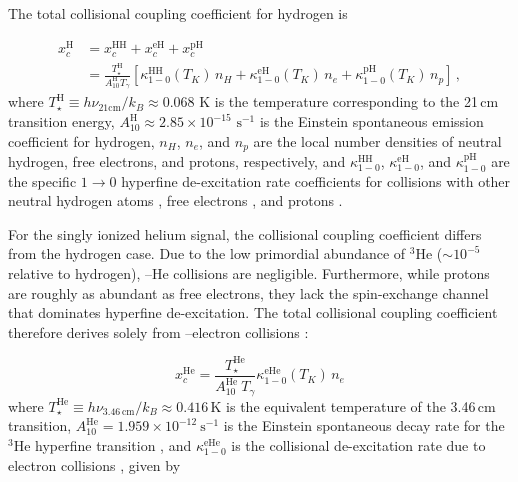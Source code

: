 \documentclass[apj,twocolumn, appendixfloats, twocolappendix, numberedappendix, tighten]{openjournal}
\begin{document}
\begin{appendix}
The total collisional coupling coefficient for hydrogen is

\begin{equation}
    \begin{split}
        x^\mathrm{H}_{c} & = x^\mathrm{HH}_c + x^\mathrm{eH}_c + x^\mathrm{pH}_c \\
        & = \frac{T^\mathrm{H}_{\star}}{A^{\mathrm{H}}_{10}T_\gamma} \left[ \kappa^\mathrm{HH}_{1-0} (T_K) \,n_H + \kappa^\mathrm{eH}_{1-0} (T_K) \,n_e + \kappa^\mathrm{pH}_{1-0} (T_K) \,n_p \right]\,,
    \end{split}
\end{equation}
where $T^\mathrm{H}_{\star} \equiv h\nu_{21\mathrm{cm}}/k_B \approx 0.068$ K is the temperature corresponding to the 21\,cm transition energy, $A^\mathrm{H}_{10} \approx 2.85 \times 10^{-15} \text{ s}^{-1}$ is the Einstein spontaneous emission coefficient for hydrogen, $n_H$, $n_e$, and $n_p$ are the local number densities of neutral hydrogen, free electrons, and protons, respectively, and $\kappa^\mathrm{HH}_{1-0}$, $\kappa^\mathrm{eH}_{1-0}$, and $\kappa^\mathrm{pH}_{1-0}$ are the specific $1 \to 0$ hyperfine de-excitation rate coefficients for collisions with other neutral hydrogen atoms \citep{Allison1969}, free electrons \citep{Furlanetto2007eH}, and protons \citep{Furlanetto2007pH}.


For the singly ionized helium signal, the collisional coupling coefficient differs from the hydrogen case. Due to the low primordial abundance of $^3$He ($\sim 10^{-5}$ relative to hydrogen), --He collisions are negligible. Furthermore, while protons are roughly as abundant as free electrons, they lack the spin-exchange channel that dominates hyperfine de-excitation. The total collisional coupling coefficient therefore derives solely from --electron collisions \citep{Takeuchi2014}:

\begin{equation}
    x^\mathrm{He}_{c} = \frac{T^\mathrm{He}_{\star} }{A^\mathrm{He}_{10} \ T_\gamma} \kappa^{\mathrm{eHe}}_{1-0}(T_K) \,  n_e
\end{equation}
where $T^\mathrm{He}_{\star} \equiv h\nu_{3.46\,\mathrm{cm}}/k_B \approx 0.416\,\mathrm{K}$ is the equivalent temperature of the 3.46\,cm transition, $A^\mathrm{He}_{10} = 1.959 \times 10^{-12}\ \mathrm{s}^{-1}$ is the Einstein spontaneous decay rate for the $^3$He hyperfine transition \citep[][]{Goldwire1967}, and $\kappa^\mathrm{eHe}_{1-0}$ is the collisional de-excitation rate due to electron collisions \citep[][]{McQuinn2009, Furlanetto2007eH}, given by


\end{appendix}
\end{document}
